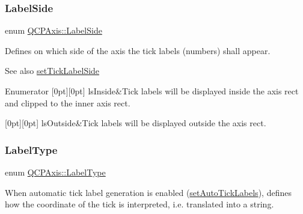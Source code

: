 \subsubsection{\texorpdfstring{Label\+Side}{LabelSide}}
{\footnotesize\ttfamily enum \mbox{\hyperlink{class_q_c_p_axis_a24b13374b9b8f75f47eed2ea78c37db9}{Q\+C\+P\+Axis\+::\+Label\+Side}}}

Defines on which side of the axis the tick labels (numbers) shall appear.

\begin{DoxySeeAlso}{See also}
\mbox{\hyperlink{class_q_c_p_axis_a13ec644fc6e22715744c92c6dfa4f0fa}{set\+Tick\+Label\+Side}} 
\end{DoxySeeAlso}
\begin{DoxyEnumFields}{Enumerator}
[0pt][0pt]{}\mbox{\label{class_q_c_p_axis_a24b13374b9b8f75f47eed2ea78c37db9aae7b027ac2839cf4ad611df30236fc3f}} 
ls\+Inside&Tick labels will be displayed inside the axis rect and clipped to the inner axis rect. \\
\hline

[0pt][0pt]{}\mbox{\label{class_q_c_p_axis_a24b13374b9b8f75f47eed2ea78c37db9a2eadb509fc0c9a8b35b85c86ec9f3c7a}} 
ls\+Outside&Tick labels will be displayed outside the axis rect. \\
\hline

\end{DoxyEnumFields}
\mbox{\label{class_q_c_p_axis_a4a7da0166f755f5abac23b765d184cad}} 
\subsubsection{\texorpdfstring{Label\+Type}{LabelType}}
{\footnotesize\ttfamily enum \mbox{\hyperlink{class_q_c_p_axis_a4a7da0166f755f5abac23b765d184cad}{Q\+C\+P\+Axis\+::\+Label\+Type}}}

When automatic tick label generation is enabled (\mbox{\hyperlink{class_q_c_p_axis_aaa47e3a6bac0c20d4beb9028f01bc1a1}{set\+Auto\+Tick\+Labels}}), defines how the coordinate of the tick is interpreted, i.\+e. translated into a string.

